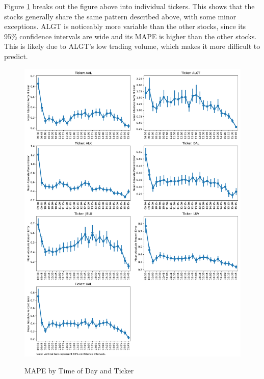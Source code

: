 \documentclass[12pt]{article}
\begin{document}
Figure \ref{fig:mape_by_time_by_ticker} breaks out the figure above into individual tickers. This shows that the stocks generally share the same pattern described above, with some minor exceptions. ALGT is noticeably more variable than the other stocks, since its 95\% confidence intervals are wide and its MAPE is higher than the other stocks. This is likely due to ALGT's low trading volume, which makes it more difficult to predict.
\begin{figure}[H]
    \centering
    \caption{MAPE by Time of Day and Ticker}
    \includegraphics[width=0.75\linewidth]{../Output/mape_by_time_by_ticker.pdf}
    \label{fig:mape_by_time_by_ticker}
\end{figure}
\end{document}

